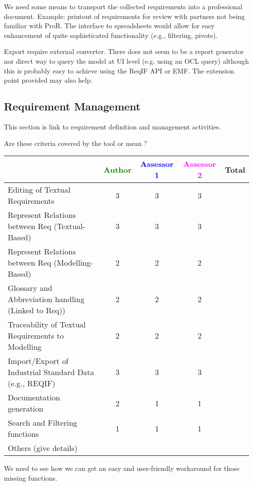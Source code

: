 \begin{assessor1}
We need some means to transport the collected requirements into a professional document. Example: printout of requirements for review with partners not being familiar with ProR. The interface to spreadsheets would allow for easy enhancement of quite sophisticated functionality (e.g., filtering, pivots).
\end{assessor1}

\begin{assessor2}
Export require external converter. There does not seem to be a report generator nor direct way to query the model at UI level (e.g. using an OCL query) although this is probably easy to achieve using the ReqIF API or EMF. The extension point provided may also help.
\end{assessor2}

\subsection{Requirement Management}

This section is link to requirement definition and management activities.

Are these criteria covered by the tool or mean ?


\begin{tabular}{|l | c | c | c | c|}
\hline
& \textcolor{green}{Author} & \textcolor{blue}{Assessor 1} & \textcolor{magenta}{Assessor 2} & Total \\
\hline
Editing of Textual Requirements & 3 & 3 & 3 &  \\
\hline
Represent Relations between Req (Textual-Based) & 3 & 3 & 3 & \\
\hline
Represent Relations between Req (Modelling-Based) & 2 & 2 & 2 & \\
\hline
Glossary and Abbreviation handling (Linked to Req)) & 2 & 2 & 2 & \\
\hline
Traceability of Textual Requirements to Modelling & 2 & 2 & 2 & \\
\hline
Import/Export of Industrial Standard Data (e.g., REQIF) & 3 & 3 & 3 & \\
\hline
Documentation generation & 2 & 1 & 1 &  \\
\hline
Search and Filtering functions & 1 & 1 & 1 & \\
\hline
Others (give details) & & & & \\
\hline
\end{tabular}

\begin{assessor1}
We need to see how we can get an easy and user-friendly workaround for those missing functions. 
\end{assessor1}


